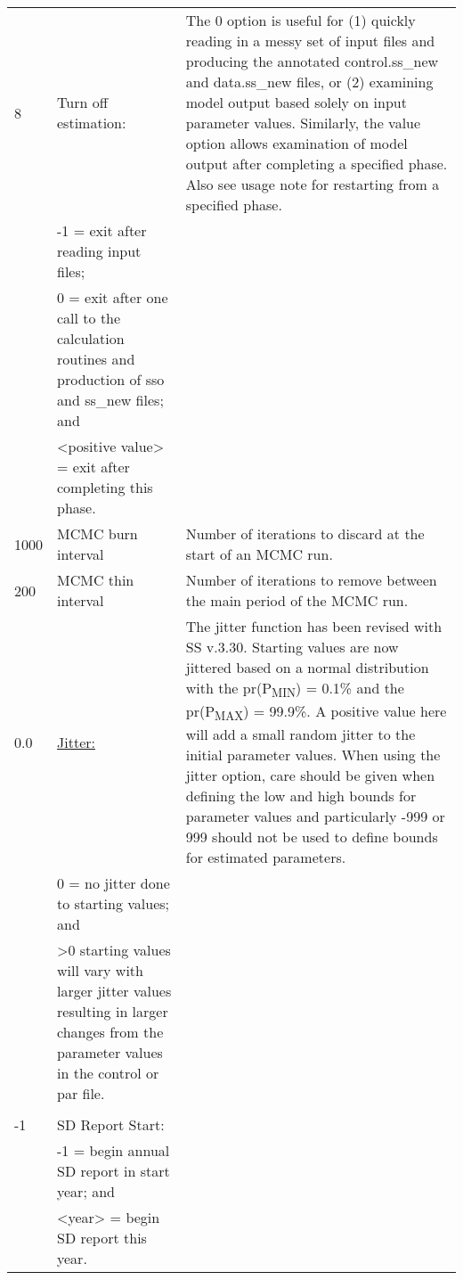 {\begin{landscape}
\begin{longtable}{p{1.5cm} p{7.2cm} p{12.3cm}}
 \hline
 8 & Turn off estimation: &  \multirow{1}{1cm}[-0.25cm]{\parbox{12.5cm}{The 0 option is useful for (1) quickly reading in a messy set of input files and producing the annotated control.ss\_new and data.ss\_new files, or (2) examining model output based solely on input parameter values.  Similarly, the value option allows examination of model output after completing a specified phase.  Also see usage note for restarting from a specified phase.}}\Tstrut\\
   & -1 = exit after reading input files; & \\
   & 0 = exit after one call to the calculation routines and production of sso and ss\_new files; and & \\
   & <positive value> = exit after completing this phase. & \\	  
	     
 \hline
 1000 & MCMC burn interval & Number of iterations to discard at the start of an MCMC run. \Tstrut\\
	   
 \hline
 200 & MCMC thin interval & Number of iterations to remove between the main period of the MCMC run. \Tstrut\\
	   
 0.0 & \hyperlink{Jitter}{Jitter:} & \multirow{1}{1cm}[-0.25cm]{\parbox{12.5cm}{The jitter function has been revised with SS v.3.30.  Starting values are now jittered based on a normal distribution with the pr(P\textsubscript{MIN}) = 0.1\% and the pr(P\textsubscript{MAX}) = 99.9\%. A positive value here will add a small random jitter to the initial parameter values.  When using the jitter option, care should be given when defining the low and high bounds for parameter values and particularly -999 or 999 should not be used to define bounds for estimated parameters.}}\Tstrut\\ 
	 & 0 = no jitter done to starting values; and & \\
	 & >0 starting values will vary with larger jitter values resulting in larger changes from the parameter values in the control or par file. & \\
	 & & \\
	
 \hline
 -1 & SD Report Start: & \Tstrut\\
    & -1 = begin annual SD report in start year; and & \\
    & <year> = begin SD report this year. & \\
	      

\end{longtable}
\end{landscape}}
